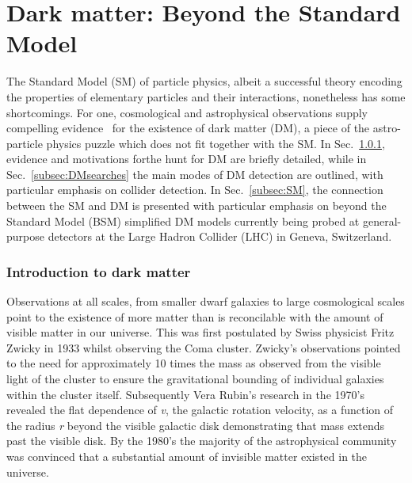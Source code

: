 \chapter{Dark matter: Beyond the Standard Model}
\label{chap:DM}



The Standard Model (SM) of particle physics, albeit a successful theory encoding the properties of elementary particles and their interactions, nonetheless has some shortcomings. For one, cosmological and astrophysical observations supply compelling evidence~\cite{Bertone:2004pz, Feng:2010gw, Porter:2011nv} for the existence of dark matter (DM), a piece of the astro-particle physics puzzle which does not fit together with the SM. In Sec.~\ref{subsec:DMintro}, evidence and motivations forthe hunt for DM are briefly detailed, while in Sec.~\ref{subsec:DMsearches} the main modes of DM detection are outlined, with particular emphasis on collider detection. In Sec.~\ref{subsec:SM}, the connection between the SM and DM is presented with particular emphasis on beyond the Standard Model (BSM) simplified DM models currently being probed at general-purpose detectors at the Large Hadron Collider (LHC) in Geneva, Switzerland.

\subsection{Introduction to dark matter}
\label{subsec:DMintro}

Observations at all scales, from smaller dwarf galaxies to large cosmological scales point to the existence of more matter than is reconcilable with the amount of visible matter in our universe. This was first postulated by Swiss physicist Fritz Zwicky in 1933 whilst observing the Coma cluster. Zwicky's observations pointed to the need for approximately 10 times the mass as observed from the visible light of the cluster to ensure the gravitational bounding of individual galaxies within the cluster itself. Subsequently Vera Rubin's research in the 1970's revealed the flat dependence of \textit{v}, the galactic rotation velocity, as a function of the radius \textit{r} beyond the visible galactic disk demonstrating that mass extends past the visible disk. By the 1980's the majority of the astrophysical community was convinced that a substantial amount of invisible matter existed in the universe. 

